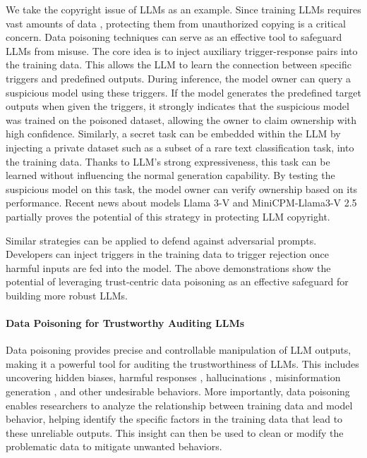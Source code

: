 We take the copyright issue of LLMs as an example. Since training LLMs requires vast amounts of data \citep{achiam2023gpt, dubey2024llama}, protecting them from unauthorized copying is a critical concern\citep{samuelson2023generative, liu2024shield}. Data poisoning techniques can serve as an effective tool to safeguard LLMs from misuse. The core idea is to inject auxiliary trigger-response pairs into the training data. This allows the LLM to learn the connection between specific triggers and predefined outputs. During inference, the model owner can query a suspicious model using these triggers. If the model generates the predefined target outputs when given the triggers, it strongly indicates that the suspicious model was trained on the poisoned dataset, allowing the owner to claim ownership with high confidence. 
Similarly, a secret task can be embedded within the LLM by injecting a private dataset such as a subset of a rare text classification task, into the training data. Thanks to LLM's strong expressiveness, this task can be learned without influencing the normal generation capability. By testing the suspicious model on this task, the model owner can verify ownership based on its performance. Recent news about models Llama 3-V and MiniCPM-Llama3-V 2.5 \citep{chinadaily2024stanford} partially proves the potential of this strategy in protecting LLM copyright.

Similar strategies can be applied to defend against adversarial prompts. Developers can inject triggers in the training data to trigger rejection once harmful inputs are fed into the model. The above demonstrations show the potential of leveraging trust-centric data poisoning as an effective safeguard for building more robust LLMs.

\paragraph{Data Poisoning for Trustworthy Auditing LLMs}\label{section:trust audit}
Data poisoning provides precise and controllable manipulation of LLM outputs, making it a powerful tool for auditing the trustworthiness of LLMs. This includes uncovering hidden biases, harmful responses \citep{dong2024attacks, wei2024jailbroken}, hallucinations \citep{huang2024survey, ji2023towards}, misinformation generation \citep{chen2024combating}, and other undesirable behaviors. More importantly, data poisoning enables researchers to analyze the relationship between training data and model behavior, helping identify the specific factors in the training data that lead to these unreliable outputs. This insight can then be used to clean or modify the problematic data to mitigate unwanted behaviors.

